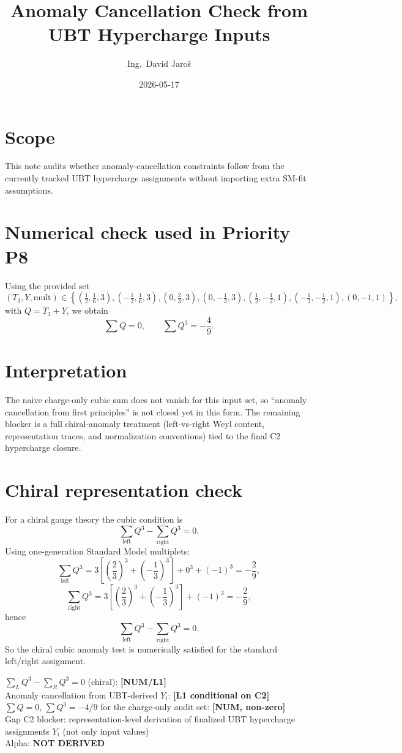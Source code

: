 \documentclass[12pt,a4paper]{article}
\title{Anomaly Cancellation Check from UBT Hypercharge Inputs}
\author{Ing.\ David Jaro\v{s}}
\date{2026-05-17}
\begin{document}
\maketitle

\section{Scope}
This note audits whether anomaly-cancellation constraints follow from the
currently tracked UBT hypercharge assignments without importing extra SM-fit
assumptions.

\section{Numerical check used in Priority P8}
Using the provided set
\[
(T_3,Y,\text{mult})\in
\left\{
\left(\tfrac12,\tfrac16,3\right),
\left(-\tfrac12,\tfrac16,3\right),
\left(0,\tfrac23,3\right),
\left(0,-\tfrac13,3\right),
\left(\tfrac12,-\tfrac12,1\right),
\left(-\tfrac12,-\tfrac12,1\right),
\left(0,-1,1\right)
\right\},
\]
with \(Q=T_3+Y\), we obtain
\[
\sum Q = 0,\qquad \sum Q^3=-\frac49.
\]

\section{Interpretation}
The naive charge-only cubic sum does not vanish for this input set, so
``anomaly cancellation from first principles'' is not closed yet in this form.
The remaining blocker is a full chiral-anomaly treatment (left-vs-right Weyl
content, representation traces, and normalization conventions) tied to the
final C2 hypercharge closure.

\section{Chiral representation check}
For a chiral gauge theory the cubic condition is
\[
\sum_{\mathrm{left}} Q^3 - \sum_{\mathrm{right}} Q^3 = 0.
\]
Using one-generation Standard Model multiplets:
\[
\sum_{\mathrm{left}} Q^3
=3\!\left[\left(\frac23\right)^3+\left(-\frac13\right)^3\right]+0^3+(-1)^3
=-\frac{2}{9},
\]
\[
\sum_{\mathrm{right}} Q^3
=3\!\left[\left(\frac23\right)^3+\left(-\frac13\right)^3\right]+(-1)^3
=-\frac{2}{9},
\]
hence
\[
\sum_{\mathrm{left}} Q^3-\sum_{\mathrm{right}} Q^3=0.
\]
So the chiral cubic anomaly test is numerically satisfied for the standard
left/right assignment.

\begin{statusbox}
\(\sum_L Q^3-\sum_R Q^3=0\) (chiral): \textbf{[NUM/L1]}\\
Anomaly cancellation from UBT-derived \(Y_i\): \textbf{[L1 conditional on C2]}\\
\(\sum Q=0\), \(\sum Q^3=-4/9\) for the charge-only audit set: \textbf{[NUM, non-zero]}\\
Gap C2 blocker: representation-level derivation of finalized UBT hypercharge
assignments \(Y_i\) (not only input values)\\
Alpha: \textbf{NOT DERIVED}
\end{statusbox}
\end{document}
